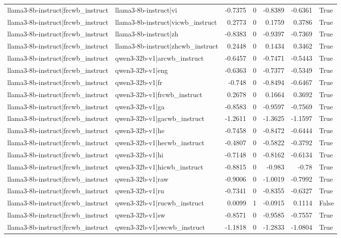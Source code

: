 \begin{table}
\begin{tabular}{l l r r r r l}
llama3-8b-instruct|frcwb_instruct & llama3-8b-instruct|vi & -0.7375 & 0 & -0.8389 & -0.6361 & True \\
llama3-8b-instruct|frcwb_instruct & llama3-8b-instruct|vicwb_instruct & 0.2773 & 0 & 0.1759 & 0.3786 & True \\
llama3-8b-instruct|frcwb_instruct & llama3-8b-instruct|zh & -0.8383 & 0 & -0.9397 & -0.7369 & True \\
llama3-8b-instruct|frcwb_instruct & llama3-8b-instruct|zhcwb_instruct & 0.2448 & 0 & 0.1434 & 0.3462 & True \\
llama3-8b-instruct|frcwb_instruct & qwen3-32b-v1|arcwb_instruct & -0.6457 & 0 & -0.7471 & -0.5443 & True \\
llama3-8b-instruct|frcwb_instruct & qwen3-32b-v1|eng & -0.6363 & 0 & -0.7377 & -0.5349 & True \\
llama3-8b-instruct|frcwb_instruct & qwen3-32b-v1|fr & -0.748 & 0 & -0.8494 & -0.6467 & True \\
llama3-8b-instruct|frcwb_instruct & qwen3-32b-v1|frcwb_instruct & 0.2678 & 0 & 0.1664 & 0.3692 & True \\
llama3-8b-instruct|frcwb_instruct & qwen3-32b-v1|ga & -0.8583 & 0 & -0.9597 & -0.7569 & True \\
llama3-8b-instruct|frcwb_instruct & qwen3-32b-v1|gacwb_instruct & -1.2611 & 0 & -1.3625 & -1.1597 & True \\
llama3-8b-instruct|frcwb_instruct & qwen3-32b-v1|he & -0.7458 & 0 & -0.8472 & -0.6444 & True \\
llama3-8b-instruct|frcwb_instruct & qwen3-32b-v1|hecwb_instruct & -0.4807 & 0 & -0.5822 & -0.3792 & True \\
llama3-8b-instruct|frcwb_instruct & qwen3-32b-v1|hi & -0.7148 & 0 & -0.8162 & -0.6134 & True \\
llama3-8b-instruct|frcwb_instruct & qwen3-32b-v1|hicwb_instruct & -0.8815 & 0 & -0.983 & -0.78 & True \\
llama3-8b-instruct|frcwb_instruct & qwen3-32b-v1|raw & -0.9006 & 0 & -1.0019 & -0.7992 & True \\
llama3-8b-instruct|frcwb_instruct & qwen3-32b-v1|ru & -0.7341 & 0 & -0.8355 & -0.6327 & True \\
llama3-8b-instruct|frcwb_instruct & qwen3-32b-v1|rucwb_instruct & 0.0099 & 1 & -0.0915 & 0.1114 & False \\
llama3-8b-instruct|frcwb_instruct & qwen3-32b-v1|sw & -0.8571 & 0 & -0.9585 & -0.7557 & True \\
llama3-8b-instruct|frcwb_instruct & qwen3-32b-v1|swcwb_instruct & -1.1818 & 0 & -1.2833 & -1.0804 & True \\

\end{tabular}
\end{table}
